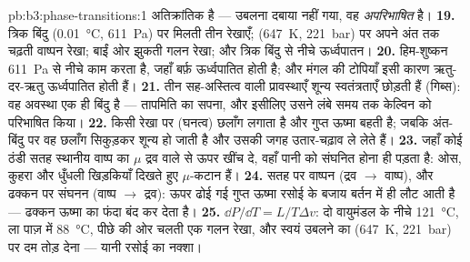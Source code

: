 \begin{solution}{pb:b3:phase-transitions:1}
अतिक्रांतिक है --- उबलना दबाया नहीं गया, वह
\emph{अपरिभाषित} है।
\textbf{19.} त्रिक बिंदु (\qty{0.01}{\celsius}, \qty{611}{Pa}) पर
मिलती तीन रेखाएँ; (\qty{647}{K}, \qty{221}{bar}) पर अपने अंत तक
चढ़ती वाष्पन रेखा; बाईं ओर झुकती
गलन रेखा; और त्रिक बिंदु से नीचे ऊर्ध्वपातन।
\textbf{20.} हिम-शुष्कन \qty{611}{Pa} से नीचे काम करता है, जहाँ
बर्फ़ ऊर्ध्वपातित होती है; और मंगल की टोपियाँ इसी कारण ऋतु-दर-ऋतु
ऊर्ध्वपातित होती हैं।
\textbf{21.} तीन सह-अस्तित्व वाली प्रावस्थाएँ शून्य स्वतंत्रताएँ
छोड़ती हैं (गिब्स): वह अवस्था एक ही बिंदु है --- तापमिति का सपना,
और इसीलिए उसने लंबे समय तक केल्विन को परिभाषित किया।
\textbf{22.} किसी रेखा पर  (घनत्व) छलाँग लगाता है और
गुप्त ऊष्मा बहती है; जबकि अंत-बिंदु पर वह छलाँग सिकुड़कर शून्य हो
जाती है और उसकी जगह उतार-चढ़ाव ले लेते हैं।
\textbf{23.} जहाँ कोई ठंडी सतह स्थानीय वाष्प का $\mu$ द्रव वाले
से ऊपर खींच दे, वहाँ पानी को संघनित होना ही पड़ता है: ओस, कुहरा
और धुँधली खिड़कियाँ दिखते हुए $\mu$-कटान हैं।
\textbf{24.} सतह पर वाष्पन (द्रव $\to$ वाष्प), और ढक्कन पर
संघनन (वाष्प $\to$ द्रव): ऊपर ढोई गई गुप्त ऊष्मा रसोई के बजाय
बर्तन में ही लौट आती है --- ढक्कन ऊष्मा का फंदा बंद कर देता है।
\textbf{25.} $\dd P/\dd T = L/T\Delta v$: दो वायुमंडल के नीचे
\qty{121}{\celsius}, ला पाज़ में \qty{88}{\celsius}, पीछे की ओर
चलती एक गलन रेखा, और स्वयं उबलने का
(\qty{647}{K}, \qty{221}{bar}) पर दम तोड़ देना --- यानी रसोई का
नक्शा।
\end{solution}
